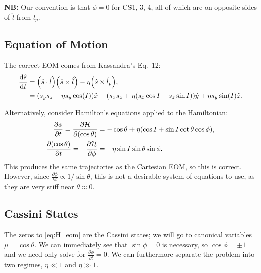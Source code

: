 \documentclass[11pt,
        usenames, %
        dvipsnames %
    ]{article}
\newcommand*{\rd}[2]{\frac{\mathrm{d}#1}{\mathrm{d}#2}}
\newcommand*{\pd}[2]{\frac{\partial#1}{\partial#2}}
\DeclarePairedDelimiter\p{\lparen}{\rparen}
\begin{document}
\textbf{NB:} Our convention is that $\phi = 0$ for CS1, 3, 4, all of which are
on opposite sides of $\hat{l}$ from $\hat{l}_p$.

\subsection{Equation of Motion}

The correct EOM comes from Kassandra's Eq.\ 12:
\begin{align*}
    \rd{\hat{s}}{t} &=
        \p*{\hat{s} \cdot \hat{l}}\p*{\hat{s} \times \hat{l}}
            -\eta\p*{\hat{s} \times \hat{l}_p},\\
        &= \p*{s_ys_z - \eta s_y\cos(I)}\hat{x}
            - \p*{s_xs_z + \eta \p*{s_x\cos I - s_z\sin I}}\hat{y}
            + \eta s_y \sin(I)\hat{z}.
\end{align*}

Alternatively, consider Hamilton's equations applied to the Hamiltonian:
\begin{align}
    \pd{\phi}{t} = \pd{\mathcal{H}}{(\cos\theta)}
        &= -\cos\theta + \eta\p*{\cos I + \sin I \cot \theta \cos \phi},\\
    \pd{(\cos \theta)}{t} = -\pd{\mathcal{H}}{\phi}
        &= -\eta \sin I \sin \theta \sin \phi.\label{eq:H_eom}
\end{align}
This produces the same trajectories as the Cartesian EOM, so this is correct.
However, since $\pd{\phi}{t} \propto 1/\sin\theta$, this is not a desirable
system of equations to use, as they are very stiff near $\theta \approx 0$.

\subsection{Cassini States}

The zeros to \autoref{eq:H_eom} are the Cassini states; we will go to canonical
variables $\mu = \cos\theta$. We can immediately see that $\sin\phi = 0$ is
necessary, so $\cos \phi = \pm 1$ and we need only solve for $\pd{\phi}{t} = 0$.
We can furthermore separate the problem into two regimes, $\eta \ll 1$ and $\eta
\gg 1$.
\end{document}
